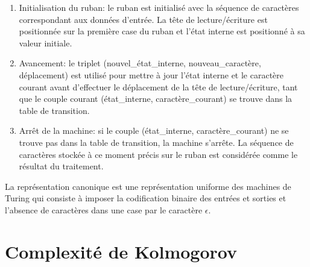 \documentclass[a4paper, 10pt, titlepage]{report}
\begin{document}
\begin{enumerate}
	\item Initialisation du ruban: le ruban est initialisé avec la séquence de caractères correspondant aux données d’entrée. La tête de lecture/écriture est positionnée sur la première case du ruban et l’état interne est positionné à sa valeur initiale.
	\item Avancement: le triplet (nouvel\_état\_interne, nouveau\_caractère, déplacement) est utilisé pour mettre à jour l’état interne et le caractère courant avant d’effectuer le déplacement de la tête de lecture/écriture, tant que le couple courant (état\_interne, caractère\_courant) se trouve dans la table de transition.
	\item Arrêt de la machine: si le couple (état\_interne, caractère\_courant) ne se trouve pas dans la table de transition, la machine s’arrête. La séquence de caractères stockée à ce moment précis sur le ruban est considérée comme le résultat du traitement.
\end{enumerate}

La représentation canonique est une représentation uniforme des machines de Turing qui consiste à imposer la codification binaire des entrées et sorties et l’absence de caractères dans une case par le caractère $\epsilon$.


\chapter{Complexité de Kolmogorov}
\end{document}
